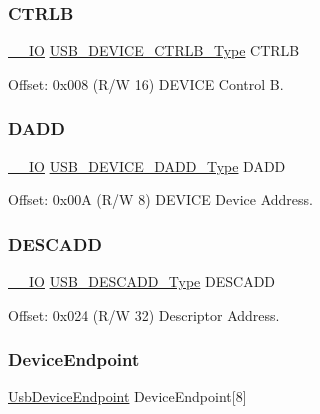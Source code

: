 \subsubsection{\texorpdfstring{CTRLB}{CTRLB}}
{\footnotesize\ttfamily \mbox{\hyperlink{core__cm0plus_8h_aec43007d9998a0a0e01faede4133d6be}{\+\_\+\+\_\+\+IO}} \mbox{\hyperlink{union_u_s_b___d_e_v_i_c_e___c_t_r_l_b___type}{U\+S\+B\+\_\+\+D\+E\+V\+I\+C\+E\+\_\+\+C\+T\+R\+L\+B\+\_\+\+Type}} C\+T\+R\+LB}



Offset\+: 0x008 (R/W 16) D\+E\+V\+I\+CE Control B. 

\mbox{\label{struct_usb_device_a7fb6fd524c4acb28f87678e680bb0cb8}} 
\subsubsection{\texorpdfstring{DADD}{DADD}}
{\footnotesize\ttfamily \mbox{\hyperlink{core__cm0plus_8h_aec43007d9998a0a0e01faede4133d6be}{\+\_\+\+\_\+\+IO}} \mbox{\hyperlink{union_u_s_b___d_e_v_i_c_e___d_a_d_d___type}{U\+S\+B\+\_\+\+D\+E\+V\+I\+C\+E\+\_\+\+D\+A\+D\+D\+\_\+\+Type}} D\+A\+DD}



Offset\+: 0x00A (R/W 8) D\+E\+V\+I\+CE Device Address. 

\mbox{\label{struct_usb_device_a4e4a634e8fbb0f0489872f7a9ee41bc4}} 
\subsubsection{\texorpdfstring{DESCADD}{DESCADD}}
{\footnotesize\ttfamily \mbox{\hyperlink{core__cm0plus_8h_aec43007d9998a0a0e01faede4133d6be}{\+\_\+\+\_\+\+IO}} \mbox{\hyperlink{union_u_s_b___d_e_s_c_a_d_d___type}{U\+S\+B\+\_\+\+D\+E\+S\+C\+A\+D\+D\+\_\+\+Type}} D\+E\+S\+C\+A\+DD}



Offset\+: 0x024 (R/W 32) Descriptor Address. 

\mbox{\label{struct_usb_device_a755b1ba1712add80d2a9193087b93baa}} 
\subsubsection{\texorpdfstring{DeviceEndpoint}{DeviceEndpoint}}
{\footnotesize\ttfamily \mbox{\hyperlink{struct_usb_device_endpoint}{Usb\+Device\+Endpoint}} Device\+Endpoint\mbox{[}8\mbox{]}}



